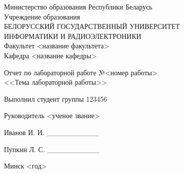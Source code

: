 \begin{titlepage}
\thispagestyle{empty}
\setlength{\parindent}{0ex} %

\begin{center}
  Министерство образования Республики Беларусь \\
  \vspace{0.5ex}
  Учреждение образования \\
  БЕЛОРУССКИЙ ГОСУДАРСТВЕННЫЙ УНИВЕРСИТЕТ \\
  ИНФОРМАТИКИ И РАДИОЭЛЕКТРОНИКИ \\
  \vspace{0.5ex}
  Факультет <название факультета> \\
  \vspace{0.5ex}
  Кафедра <название кафедры>
\end{center}

\vspace{50mm}

\begin{center}
  Отчет по лабораторной работе №<номер работы> \\
  <<Тема лабораторной работы>>
\end{center}

\vspace{50mm}

\begin{minipage}{.55\linewidth}
    Выполнил студент группы 123456

    \smallskip

    Руководитель <ученое звание>
\end{minipage}
\hfill
\begin{minipage}{.4\linewidth}
  \begin{flushright}
    Иванов И. И. \_\_\_\_\_\_\_\_\_\_

    \smallskip

    Пупкин Л. С. \_\_\_\_\_\_\_\_\_\_
  \end{flushright}
\end{minipage}

\vfill
\begin{center}
  Минск <год>
\end{center}

\setlength{\parindent}{1.25cm} %
\end{titlepage}
